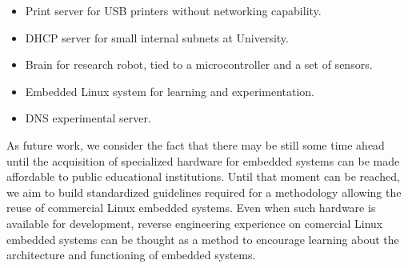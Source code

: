 \documentclass[conference]{IEEEtran}
\newcommand{\nota}[1]{}
\begin{document}
\nota{
\begin{itemize}
\item Como servidor de impresión para impresoras USB sin conexiones de red.
\item Como servidor DHCP en pequeñas redes internas de la Universidad.
\item Como cerebro de un robot experimental, que se comunica con 
un microcontrolador y sensores.
\item Como sistema Linux embebido para aprendizaje y experimentación.
\item Y como un servidor DNS experimental.
\end{itemize}
}

\begin{itemize}
\item Print server for USB printers without networking capability. 
\item DHCP server for small internal subnets at University. 
\item Brain for research robot, tied to a microcontroller and a set of sensors. 
\item Embedded Linux system for learning and experimentation.  
\item DNS experimental server.  
\end{itemize}

\nota{
Como trabajo futuro, se espera repetir la experiencia \cite{gpl}
en futuros sistemas Linux embebidos comerciales, para estandarizar
las tareas necesarias en una metodología, y hasta que la
posibilidad de adquirir hardware especializado para desarrollos
de sistemas Linux embebidos sea mucho mas accesible para
las instituciones publicas. En cuyo caso, la experiencia
de ingeniería inversa se puede mantener sobre productos comerciales,
como una manera de incentivar el aprendizaje del funcionamiento
y la arquitectura de los sistemas embebidos.
}

As future work, we consider the fact that there may be still some time ahead until the acquisition of specialized hardware for embedded systems can be made affordable to public educational institutions. Until that moment can be reached, we aim to build standardized guidelines required for a methodology allowing the reuse of commercial Linux embedded systems. Even when such hardware is available  for development, reverse engineering 
experience on comercial Linux embedded systems can be thought as 
a method to encourage learning about the architecture and functioning of embedded systems. 
\end{document}
